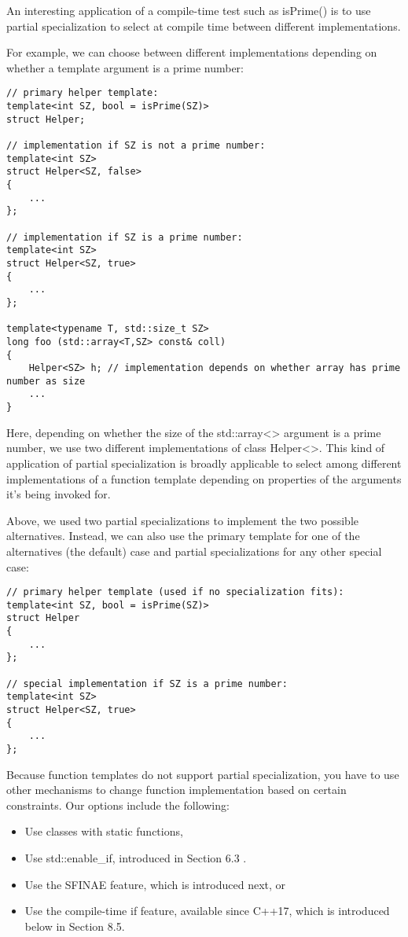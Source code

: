 An interesting application of a compile-time test such as isPrime() is to use partial specialization to select at compile time between different implementations.

For example, we can choose between different implementations depending on whether a template argument is a prime number:

\begin{lstlisting}[style=styleCXX]
// primary helper template:
template<int SZ, bool = isPrime(SZ)>
struct Helper;

// implementation if SZ is not a prime number:
template<int SZ>
struct Helper<SZ, false>
{
	...
};

// implementation if SZ is a prime number:
template<int SZ>
struct Helper<SZ, true>
{
	...
};

template<typename T, std::size_t SZ>
long foo (std::array<T,SZ> const& coll)
{
	Helper<SZ> h; // implementation depends on whether array has prime number as size
	...
}
\end{lstlisting}

Here, depending on whether the size of the std::array<> argument is a prime number, we use two different implementations of class Helper<>. This kind of application of partial specialization is broadly applicable to select among different implementations of a function template depending on properties of the arguments it’s being invoked for.

Above, we used two partial specializations to implement the two possible alternatives. Instead, we can also use the primary template for one of the alternatives (the default) case and partial specializations for any other special case:

\begin{lstlisting}[style=styleCXX]
// primary helper template (used if no specialization fits):
template<int SZ, bool = isPrime(SZ)>
struct Helper
{
	...
};

// special implementation if SZ is a prime number:
template<int SZ>
struct Helper<SZ, true>
{
	...
};
\end{lstlisting}

Because function templates do not support partial specialization, you have to use other mechanisms to change function implementation based on certain constraints. Our options include the following:

\begin{itemize}
\item 
Use classes with static functions,

\item 
Use std::enable\_if, introduced in Section 6.3 .

\item 
Use the SFINAE feature, which is introduced next, or

\item 
Use the compile-time if feature, available since C++17, which is introduced below in Section 8.5.
\end{itemize}

